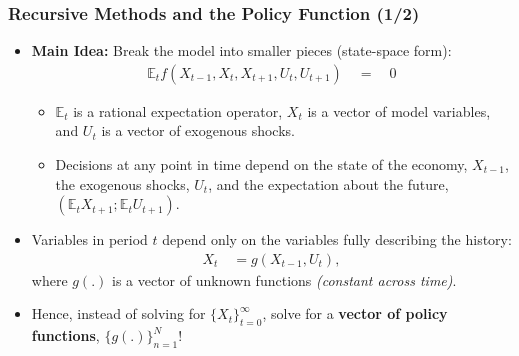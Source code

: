 \documentclass[10pt,c,aspectratio=1610,handout]{beamer}
\begin{document}
\begin{frame}%
  \frametitle{Recursive Methods and the Policy Function (1/2)}%
  \begin{itemize}%
    \item[$\blacktriangleright$] \textbf{Main Idea:} Break the model into smaller pieces (state-space form):%
      \begin{align*}%
        \mathbb{E}_t f \left(X_{t-1},X_t,X_{t+1},U_t,U_{t+1}\right) \quad = \quad 0%
      \end{align*}%
      \vspace*{-0.2in}%
      \begin{footnotesize}%
        \begin{itemize}%
          \item[$\blacktriangleright$] $\mathbb{E}_t$ is a rational expectation operator, $X_t$ is a vector of model variables, and $U_t$ is a vector of exogenous shocks.%
          \item[$\blacktriangleright$] Decisions at any point in time depend on the state of the economy, $X_{t-1}$, the exogenous shocks, $U_t$, and the expectation about the future, $\left(\mathbb{E}_t X_{t+1}; \mathbb{E}_t U_{t+1}\right)$.%
        \end{itemize}%
      \end{footnotesize}%
      \pause%
    \item[$\blacktriangleright$] Variables in period $t$ depend only on the variables fully describing the history:%
      \begin{align*}%
        X_t \quad = g \left(X_{t-1},U_t\right),%
      \end{align*}%
      where $g\left(.\right)$ is a vector of unknown functions \emph{(constant across time)}.%
      \pause%
      \vspace*{0.1in}%
    \item[$\Rightarrow$] Hence, instead of solving for $\{X_t\}_{t=0}^{\infty}$, solve for a \textbf{vector of policy functions}, $\{ g\left(.\right) \}_{n=1}^{N}$!%
  \end{itemize}%
\end{frame}%
\end{document}
